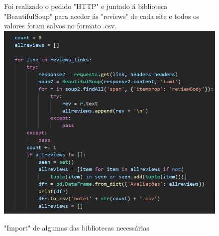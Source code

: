 \documentclass[a4paper,10pt]{article}
\begin{document}
\newpage

\begin{figure}[!htb]
Foi realizado o pedido "HTTP" e juntado á biblioteca "BeautifulSoup" para aceder ás "reviews" de cada site e todos os valores foram salvos no formato .csv.
    \centering
    \includegraphics[width=15cm]{9.PNG}
    \caption{"Import" de algumas das bibliotecas necessárias}
    \label{fig:my_label}
\end{figure}

\newpage
\end{document}
